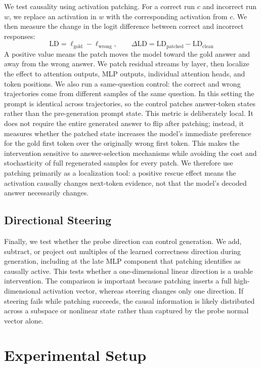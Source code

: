 \documentclass{article}
\begin{document}
We test causality using activation patching. For a correct run $c$ and incorrect run $w$, we replace an activation in $w$ with the corresponding activation from $c$. We then measure the change in the logit difference between correct and incorrect responses:
\[
\mathrm{LD}=\ell_{\text{gold}}-\ell_{\text{wrong}},\qquad
\Delta\mathrm{LD}=\mathrm{LD}_{\text{patched}}-\mathrm{LD}_{\text{clean}}
\]
A positive value means the patch moves the model toward the gold answer and away from the wrong answer. We patch residual streams by layer, then localize the effect to attention outputs, MLP outputs, individual attention heads, and token positions. We also run a same-question control: the correct and wrong trajectories come from different samples of the same question. In this setting the prompt is identical across trajectories, so the control patches answer-token states rather than the pre-generation prompt state. This metric is deliberately local. It does not require the entire generated answer to flip after patching; instead, it measures whether the patched state increases the model's immediate preference for the gold first token over the originally wrong first token. This makes the intervention sensitive to answer-selection mechanisms while avoiding the cost and stochasticity of full regenerated samples for every patch. We therefore use patching primarily as a localization tool: a positive rescue effect means the activation causally changes next-token evidence, not that the model's decoded answer necessarily changes.

\subsection{Directional Steering}

Finally, we test whether the probe direction can control generation. We add,
subtract, or project out multiples of the learned correctness direction during generation, including at the late MLP component that patching identifies as causally active. This tests whether a one-dimensional linear direction is a usable intervention. The comparison is important because patching inserts a full high-dimensional activation vector, whereas steering changes only one direction. If steering fails while patching succeeds, the causal information is likely distributed across a subspace or nonlinear state rather than captured by the probe normal vector alone.

\section{Experimental Setup}
\end{document}
